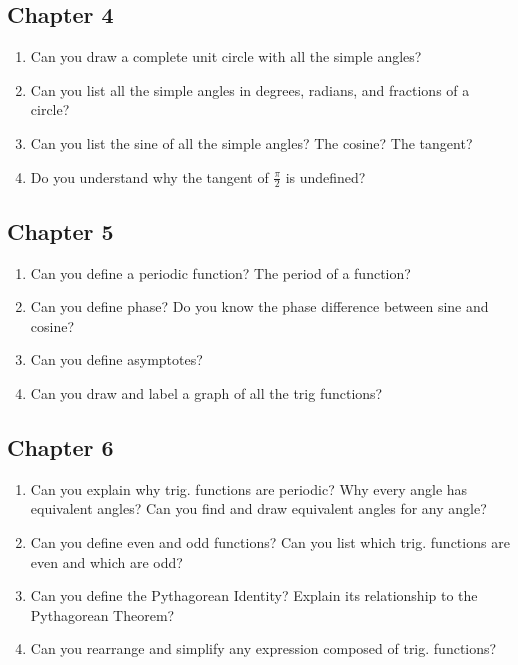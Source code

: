 \subsection{Chapter 4}
\begin{enumerate}


\item{Can you draw a complete unit circle with all the simple angles?}

\item{Can you list all the simple angles in degrees, radians, and fractions of a circle?}

\item{Can you list the sine of all the simple angles?  The cosine?  The tangent?}

\item{Do you understand why the tangent of $\frac{\pi}{2}$ is undefined?}

\end{enumerate}
\subsection{Chapter 5}
\begin{enumerate}


\item{Can you define a periodic function?  The period of a function?}

\item{Can you define phase?  Do you know the phase difference between sine and cosine?}

\item{Can you define asymptotes?}

\item{Can you draw and label a graph of all the trig functions?}\\


\end{enumerate}
\subsection{Chapter 6}
\begin{enumerate}

\item{Can you explain why trig. functions are periodic?  Why every angle has equivalent angles?  Can you find and draw equivalent angles for any angle?}

\item{Can you define even and odd functions?  Can you list which trig. functions are even and which are odd?}

\item{Can you define the Pythagorean Identity?  Explain its relationship to the Pythagorean Theorem?}

\item{Can you rearrange and simplify any expression composed of trig. functions?}

\end{enumerate}
